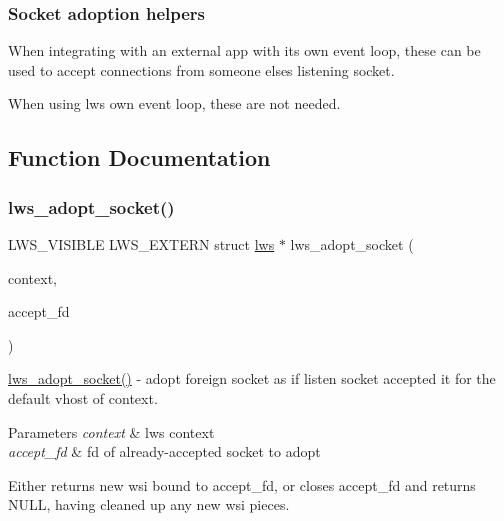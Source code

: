 \subsubsection*{Socket adoption helpers}

When integrating with an external app with its own event loop, these can be used to accept connections from someone else\textquotesingle{}s listening socket.

When using lws own event loop, these are not needed. 

\subsection{Function Documentation}
\mbox{\label{group__sock-adopt_ga2003db73fc10b05b8e17a9ee715727a9}} 
\subsubsection{\texorpdfstring{lws\+\_\+adopt\+\_\+socket()}{lws\_adopt\_socket()}}
{\footnotesize\ttfamily L\+W\+S\+\_\+\+V\+I\+S\+I\+B\+LE L\+W\+S\+\_\+\+E\+X\+T\+E\+RN struct \hyperlink{structlws}{lws} $\ast$ lws\+\_\+adopt\+\_\+socket (\begin{DoxyParamCaption}\item[{struct \hyperlink{structlws__context}{lws\+\_\+context} $\ast$}]{context,  }\item[{lws\+\_\+sockfd\+\_\+type}]{accept\+\_\+fd }\end{DoxyParamCaption})}

\hyperlink{group__sock-adopt_ga2003db73fc10b05b8e17a9ee715727a9}{lws\+\_\+adopt\+\_\+socket()} -\/ adopt foreign socket as if listen socket accepted it for the default vhost of context.


\begin{DoxyParams}{Parameters}
{\em context} & lws context \\
\hline
{\em accept\+\_\+fd} & fd of already-\/accepted socket to adopt\\
\hline
\end{DoxyParams}
Either returns new wsi bound to accept\+\_\+fd, or closes accept\+\_\+fd and returns N\+U\+LL, having cleaned up any new wsi pieces.

